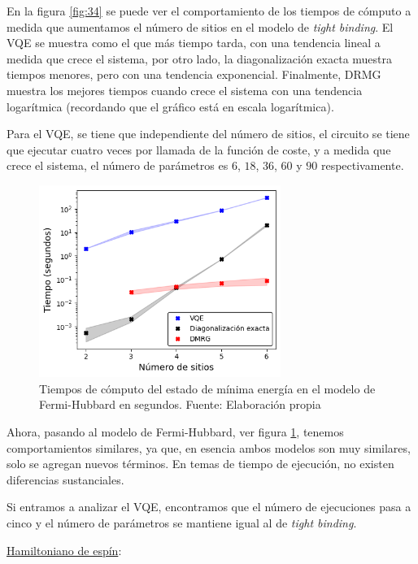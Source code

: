 En la figura \ref{fig:34} se puede ver el comportamiento de los tiempos de cómputo a medida que aumentamos el número de sitios en el modelo de \textit{tight binding}. El VQE se muestra como el que más tiempo tarda, con una tendencia lineal a medida que crece el sistema, por otro lado, la diagonalización exacta muestra tiempos menores, pero con una tendencia exponencial. Finalmente, DRMG muestra los mejores tiempos cuando crece el sistema con una tendencia logarítmica (recordando que el gráfico está en escala logarítmica). 

Para el VQE, se tiene que independiente del número de sitios, el circuito se tiene que ejecutar cuatro veces por llamada de la función de coste, y a medida que crece el sistema, el número de parámetros es $6$, $18$, $36$, $60$ y $90$ respectivamente.


\begin{figure}[H]
\centering
\includegraphics[width=0.7\textwidth]{figures/S4/fermi/tiempofb.png}
\caption{\label{fig:35} Tiempos de cómputo del estado de mínima energía en el modelo de Fermi-Hubbard en segundos. Fuente: Elaboración propia}
\end{figure}

Ahora, pasando al modelo de Fermi-Hubbard, ver figura \ref{fig:35}, tenemos comportamientos similares, ya que, en esencia ambos modelos son muy similares, solo se agregan nuevos términos. En temas de tiempo de ejecución, no existen diferencias sustanciales.

Si entramos a analizar el VQE, encontramos que el número de ejecuciones pasa a cinco y el número de parámetros se mantiene igual al de \textit{tight binding}.

\underline{Hamiltoniano de espín}: 

